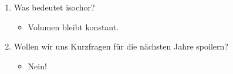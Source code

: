 \begin{enumerate}
    \item Was bedeutet isochor?
    \begin{itemize}
        \item Volumen bleibt konstant.
    \end{itemize}

    \item Wollen wir uns Kurzfragen für die nächsten Jahre spoilern?
    \begin{itemize}
        \item Nein!
    \end{itemize}

\end{enumerate}